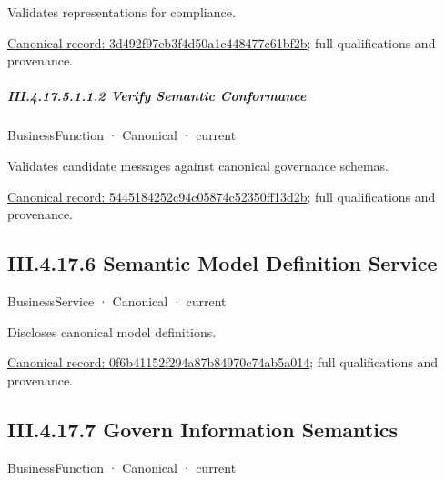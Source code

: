 Validates representations for compliance.


{\footnotesize \href{../../../../../../../../continuum/business/business-service/3d492f97eb3f4d50a1c448477c61bf2b.md}{Canonical record: 3d492f97eb3f4d50a1c448477c61bf2b}; full qualifications and provenance.}\par
\subparagraph*{III.4.17.5.1.1.2 Verify Semantic Conformance}
\label{navigation:III.4.17.5.1.1.2}

\label{element:5445184252c94c05874c52350ff13d2b}
{\small BusinessFunction · Canonical · current}\par

Validates candidate messages against canonical governance schemas.


{\footnotesize \href{../../../../../../../../continuum/business/business-function/5445184252c94c05874c52350ff13d2b.md}{Canonical record: 5445184252c94c05874c52350ff13d2b}; full qualifications and provenance.}\par
\subsection*{III.4.17.6 Semantic Model Definition Service}
\label{navigation:III.4.17.6}

\label{element:0f6b41152f294a87b84970c74ab5a014}
{\small BusinessService · Canonical · current}\par

Discloses canonical model definitions.


{\footnotesize \href{../../../../../../../../continuum/business/business-service/0f6b41152f294a87b84970c74ab5a014.md}{Canonical record: 0f6b41152f294a87b84970c74ab5a014}; full qualifications and provenance.}\par
\subsection*{III.4.17.7 Govern Information Semantics}
\label{navigation:III.4.17.7}

\label{element:39a297b6c40c44ecba64857f6c3f3e0f}
{\small BusinessFunction · Canonical · current}\par


